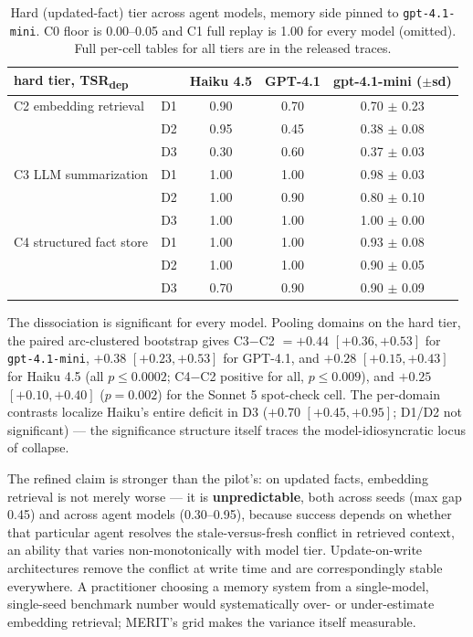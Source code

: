 \documentclass[journal]{IEEEtran}
\newcommand{\merit}{\textsc{MERIT}}
\begin{document}
\begin{table}[t]
\centering
\caption{Hard (updated-fact) tier across agent models, memory side pinned
to \texttt{gpt-4.1-mini}. C0 floor is 0.00--0.05 and C1 full replay is
1.00 for every model (omitted). Full per-cell tables for all tiers are in
the released traces.}
\label{tab:phasec}
\small
\begin{tabular}{llccc}
\toprule
hard tier, TSR\textsubscript{dep} & & Haiku 4.5 & GPT-4.1 & gpt-4.1-mini ($\pm$sd) \\
\midrule
C2 embedding retrieval & D1 & 0.90 & 0.70 & 0.70 $\pm$ 0.23 \\
 & D2 & 0.95 & 0.45 & 0.38 $\pm$ 0.08 \\
 & D3 & 0.30 & 0.60 & 0.37 $\pm$ 0.03 \\
\midrule
C3 LLM summarization & D1 & 1.00 & 1.00 & 0.98 $\pm$ 0.03 \\
 & D2 & 1.00 & 0.90 & 0.80 $\pm$ 0.10 \\
 & D3 & 1.00 & 1.00 & 1.00 $\pm$ 0.00 \\
\midrule
C4 structured fact store & D1 & 1.00 & 1.00 & 0.93 $\pm$ 0.08 \\
 & D2 & 1.00 & 1.00 & 0.90 $\pm$ 0.05 \\
 & D3 & 0.70 & 0.90 & 0.90 $\pm$ 0.09 \\
\bottomrule
\end{tabular}
\end{table}

The dissociation is significant for every model. Pooling domains on the
hard tier, the paired arc-clustered bootstrap gives C3$-$C2 $= +0.44$
$[+0.36, +0.53]$ for \texttt{gpt-4.1-mini}, $+0.38$ $[+0.23, +0.53]$ for
GPT-4.1, and $+0.28$ $[+0.15, +0.43]$ for Haiku 4.5 (all $p \le 0.0002$;
C4$-$C2 positive for all, $p \le 0.009$), and $+0.25$ $[+0.10, +0.40]$
($p = 0.002$) for the Sonnet 5 spot-check cell. The per-domain contrasts
localize Haiku's entire deficit in D3 ($+0.70$ $[+0.45, +0.95]$; D1/D2
not significant) --- the significance structure itself traces the
model-idiosyncratic locus of collapse.

The refined claim is stronger than the pilot's: on updated facts,
embedding retrieval is not merely worse --- it is \textbf{unpredictable},
both across seeds (max gap 0.45) and across agent models (0.30--0.95),
because success depends on whether that particular agent resolves the
stale-versus-fresh conflict in retrieved context, an ability that varies
non-monotonically with model tier. Update-on-write architectures remove
the conflict at write time and are correspondingly stable everywhere. A
practitioner choosing a memory system from a single-model, single-seed
benchmark number would systematically over- or under-estimate embedding
retrieval; \merit{}'s grid makes the variance itself measurable.
\end{document}
